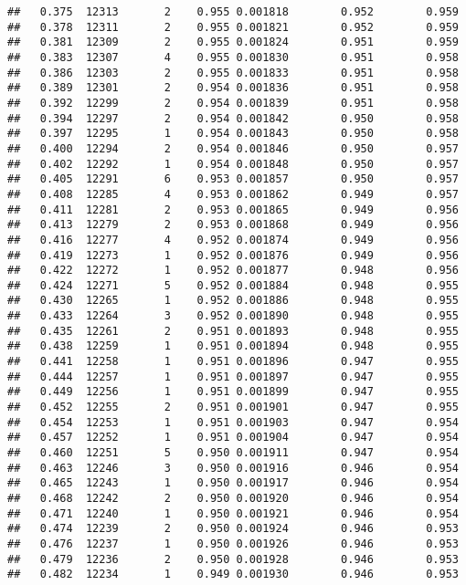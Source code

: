 \documentclass[
]{book}
\begin{document}
\begin{verbatim}
##   0.375  12313       2    0.955 0.001818        0.952        0.959
##   0.378  12311       2    0.955 0.001821        0.952        0.959
##   0.381  12309       2    0.955 0.001824        0.951        0.959
##   0.383  12307       4    0.955 0.001830        0.951        0.958
##   0.386  12303       2    0.955 0.001833        0.951        0.958
##   0.389  12301       2    0.954 0.001836        0.951        0.958
##   0.392  12299       2    0.954 0.001839        0.951        0.958
##   0.394  12297       2    0.954 0.001842        0.950        0.958
##   0.397  12295       1    0.954 0.001843        0.950        0.958
##   0.400  12294       2    0.954 0.001846        0.950        0.957
##   0.402  12292       1    0.954 0.001848        0.950        0.957
##   0.405  12291       6    0.953 0.001857        0.950        0.957
##   0.408  12285       4    0.953 0.001862        0.949        0.957
##   0.411  12281       2    0.953 0.001865        0.949        0.956
##   0.413  12279       2    0.953 0.001868        0.949        0.956
##   0.416  12277       4    0.952 0.001874        0.949        0.956
##   0.419  12273       1    0.952 0.001876        0.949        0.956
##   0.422  12272       1    0.952 0.001877        0.948        0.956
##   0.424  12271       5    0.952 0.001884        0.948        0.955
##   0.430  12265       1    0.952 0.001886        0.948        0.955
##   0.433  12264       3    0.952 0.001890        0.948        0.955
##   0.435  12261       2    0.951 0.001893        0.948        0.955
##   0.438  12259       1    0.951 0.001894        0.948        0.955
##   0.441  12258       1    0.951 0.001896        0.947        0.955
##   0.444  12257       1    0.951 0.001897        0.947        0.955
##   0.449  12256       1    0.951 0.001899        0.947        0.955
##   0.452  12255       2    0.951 0.001901        0.947        0.955
##   0.454  12253       1    0.951 0.001903        0.947        0.954
##   0.457  12252       1    0.951 0.001904        0.947        0.954
##   0.460  12251       5    0.950 0.001911        0.947        0.954
##   0.463  12246       3    0.950 0.001916        0.946        0.954
##   0.465  12243       1    0.950 0.001917        0.946        0.954
##   0.468  12242       2    0.950 0.001920        0.946        0.954
##   0.471  12240       1    0.950 0.001921        0.946        0.954
##   0.474  12239       2    0.950 0.001924        0.946        0.953
##   0.476  12237       1    0.950 0.001926        0.946        0.953
##   0.479  12236       2    0.950 0.001928        0.946        0.953
##   0.482  12234       1    0.949 0.001930        0.946        0.953

\end{verbatim}
\end{document}
